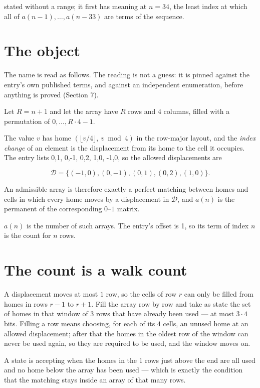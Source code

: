 \documentclass[11pt]{article}
\theoremstyle{definition}
\begin{document}
stated without a range; it first has meaning at $n = 34$, the least index at which all of $a(n-1),\dots,a(n-33)$ are terms of the sequence.

\section{The object}

The name is read as follows. The reading is not a guess: it is pinned against the entry's own published terms, and against an independent enumeration, before anything is proved (Section 7).

Let $R = n + 1$ and let the array have $R$ rows and $4$ columns, filled with a permutation of $0,\dots,R\cdot4-1$.

The value $v$ has home $(\lfloor v/4\rfloor,\ v \bmod 4)$ in the row-major layout, and the {\itshape index change} of an element is the displacement from its home to the cell it occupies. The entry lists 0,1, 0,-1, 0,2, 1,0, -1,0, so the allowed displacements are

\[\mathcal{D} = \{(-1,0), (0,-1), (0,1), (0,2), (1,0)\}.\]

An admissible array is therefore exactly a perfect matching between homes and cells in which every home moves by a displacement in $\mathcal{D}$, and $a(n)$ is the permanent of the corresponding $0$--$1$ matrix.

$a(n)$ is the number of such arrays. The entry's offset is 1, so its term of index $n$ is the count for $n$ rows.

\section{The count is a walk count}

A displacement moves at most $1$ row, so the cells of row $r$ can only be filled from homes in rows $r-1$ to $r+1$. Fill the array row by row and take as state the set of homes in that window of $3$ rows that have already been used --- at most $3\cdot4$ bits. Filling a row means choosing, for each of its $4$ cells, an unused home at an allowed displacement; after that the homes in the oldest row of the window can never be used again, so they are required to be used, and the window moves on.

A state is accepting when the homes in the $1$ rows just above the end are all used and no home below the array has been used --- which is exactly the condition that the matching stays inside an array of that many rows.
\end{document}

